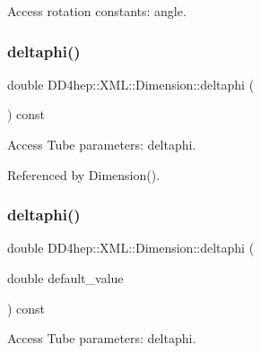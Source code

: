 Access rotation constants\+: angle. 

\hypertarget{struct_d_d4hep_1_1_x_m_l_1_1_dimension_af6a421e1f291a1190db13fb71556c588}{}\label{struct_d_d4hep_1_1_x_m_l_1_1_dimension_af6a421e1f291a1190db13fb71556c588} 
\subsubsection{\texorpdfstring{deltaphi()}{deltaphi()}\hspace{0.1cm}{\footnotesize\ttfamily [1/2]}}
{\footnotesize\ttfamily double D\+D4hep\+::\+X\+M\+L\+::\+Dimension\+::deltaphi (\begin{DoxyParamCaption}{ }\end{DoxyParamCaption}) const}



Access Tube parameters\+: deltaphi. 



Referenced by Dimension().

\hypertarget{struct_d_d4hep_1_1_x_m_l_1_1_dimension_af75d02b3737e0fb60610add557a819c9}{}\label{struct_d_d4hep_1_1_x_m_l_1_1_dimension_af75d02b3737e0fb60610add557a819c9} 
\subsubsection{\texorpdfstring{deltaphi()}{deltaphi()}\hspace{0.1cm}{\footnotesize\ttfamily [2/2]}}
{\footnotesize\ttfamily double D\+D4hep\+::\+X\+M\+L\+::\+Dimension\+::deltaphi (\begin{DoxyParamCaption}\item[{double}]{default\+\_\+value }\end{DoxyParamCaption}) const}



Access Tube parameters\+: deltaphi. 

\hypertarget{struct_d_d4hep_1_1_x_m_l_1_1_dimension_a67755cfb0f2270c4dac9b6a8b3f80211}{}\label{struct_d_d4hep_1_1_x_m_l_1_1_dimension_a67755cfb0f2270c4dac9b6a8b3f80211} 
